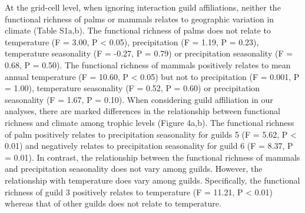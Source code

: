 \documentclass[
]{agujournal2019}
\begin{document}
At the grid-cell level, when ignoring interaction guild affiliations,
neither the functional richness of palms or mammals relates to
geographic variation in climate (Table S1a,b). The functional richness
of palms does not relate to temperature (F = 3.00, P \textless{} 0.05),
precipitation (F = 1.19, P = 0.23), temperature seasonality (F = -0.27,
P = 0.79) or precipitation seasonality (F = 0.68, P = 0.50). The
functional richness of mammals positively relates to mean annual
temperature (F = 10.60, P \textless{} 0.05) but not to precipitation (F
= 0.001, P = 1.00), temperature seasonality (F = 0.52, P = 0.60) or
precipitation seasonality (F = 1.67, P = 0.10). When considering guild
affiliation in our analyses, there are marked differences in the
relationship between functional richness and climate among trophic
levels (Figure 4a,b). The functional richness of palm positively relates
to precipitation seasonality for guilds 5 (F = 5.62, P \textless{} 0.01)
and negatively relates to precipitation seasonality for guild 6 (F =
8.37, P = 0.01). In contrast, the relationship between the functional
richness of mammals and precipitation seasonality does not vary among
guilds. However, the relationship with temperature does vary among
guilds. Specifically, the functional richness of guild 3 positively
relates to temperature (F = 11.21, P \textless{} 0.01) whereas that of
other guilds does not relate to temperature.  
\end{document}
